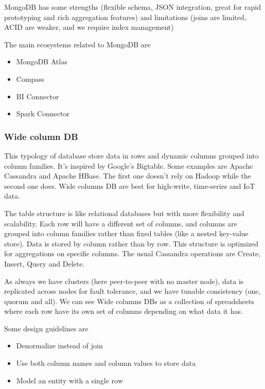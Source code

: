 MongoDB has some strengths (flexible schema, JSON integration, great for rapid prototyping and rich aggregation features) and limitations (joins are limited, ACID are weaker, and we require index management)

\vspace{10pt}

The main ecosystems related to MongoDB are 
\begin{itemize}
    \item MongoDB Atlas
    \item Compass
    \item BI Connector
    \item Spark Connector
\end{itemize}


\subsubsection{Wide column DB}

This typology of database store data in rows and dynamic columns grouped into column families. It's inspired by Google's Bigtable. Some examples are Apache Cassandra and Apache HBase. The first one doesn't rely on Hadoop while the second one does. Wide columns DB are best for high-write, time-series and IoT data. 

The table structure is like relational databases but with more flexibility and scalability. Each row will have a different set of columns, and columns are grouped into column families rather than fixed tables (like a nested key-value store). Data is stored by column rather than by row. This structure is optimized for aggregations on specific columns. The usual Cassandra operations are Create, Insert, Query and Delete. 

\vspace{10pt}

As always we have clusters (here peer-to-peer with no master node), data is replicated across nodes for fault tolerance, and we have tunable consistency (one, quorum and all). We can see Wide columns DBs as a collection of spreadsheets where each row have its own set of columns depending on what data it has. 

\vspace{10pt}

Some design guidelines are 
\begin{itemize}
    \item Denormalize instead of join
    \item Use both column names and column values to store data
    \item Model an entity with a single row
\end{itemize}


